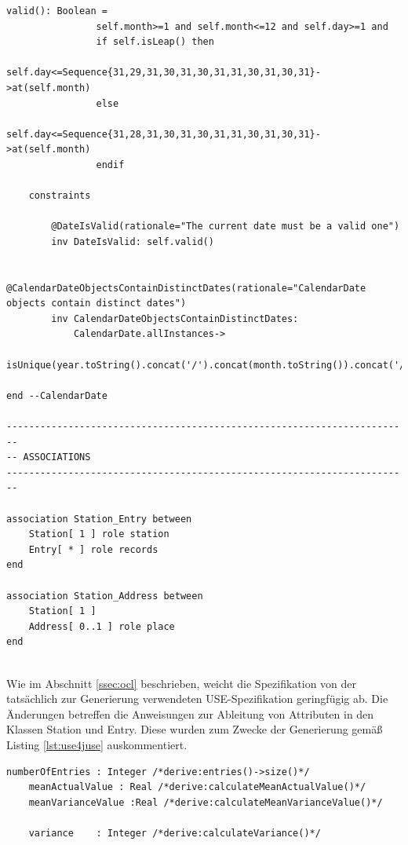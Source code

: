 \documentclass[a4paper,twoside]{article}
\begin{document}
\begin{lstlisting}[caption={Vollständige USE-Spezifikation des IceCream Modells},label=lst:completeUSE]
		valid(): Boolean =
				self.month>=1 and self.month<=12 and self.day>=1 and
				if self.isLeap() then
					self.day<=Sequence{31,29,31,30,31,30,31,31,30,31,30,31}->at(self.month)
				else 
					self.day<=Sequence{31,28,31,30,31,30,31,31,30,31,30,31}->at(self.month)
				endif

	constraints
	
		@DateIsValid(rationale="The current date must be a valid one")
		inv DateIsValid: self.valid()
		
		@CalendarDateObjectsContainDistinctDates(rationale="CalendarDate objects contain distinct dates")
		inv CalendarDateObjectsContainDistinctDates:
			CalendarDate.allInstances->
				isUnique(year.toString().concat('/').concat(month.toString()).concat('/').concat(day.toString()))
		
end --CalendarDate

------------------------------------------------------------------------
-- ASSOCIATIONS
------------------------------------------------------------------------
	
association Station_Entry between
	Station[ 1 ] role station
	Entry[ * ] role records
end

association Station_Address between
	Station[ 1 ] 
	Address[ 0..1 ] role place
end


\end{lstlisting}

Wie im Abschnitt \ref{ssec:ocl} beschrieben, weicht die Spezifikation von der tatsächlich zur Generierung verwendeten USE-Spezifikation geringfügig ab. Die Änderungen betreffen die Anweisungen zur Ableitung von Attributen in den Klassen Station und Entry. Diese wurden zum Zwecke der Generierung gemäß Listing \ref{lst:use4juse} auskommentiert.

\begin{lstlisting}[caption={Auskommentierte Code-Fragmente der USE-Spezifikation},label=lst:use4juse]
	numberOfEntries : Integer /*derive:entries()->size()*/
	meanActualValue : Real /*derive:calculateMeanActualValue()*/
	meanVarianceValue :Real /*derive:calculateMeanVarianceValue()*/
	
	variance	: Integer /*derive:calculateVariance()*/

\end{lstlisting} 


\twocolumn

\vfill
\end{document}
